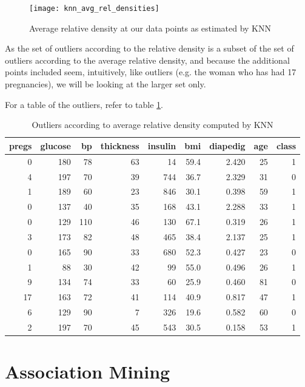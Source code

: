 \begin{figure}[htbp]
  \centering
  \texttt{[image: knn\_avg\_rel\_densities]}
  \caption{Average relative density at our data points as estimated by KNN}
  \label{fig:knn-avg-rel}
\end{figure}

As the set of outliers according to the relative density
is a subset of
the set of outliers according to the average relative density,
and because the additional points included seem, intuitively, like outliers
(e.g. the woman who has had 17 pregnancies),
we will be looking at the larger set only.

For a table of the outliers, refer to table \ref{tab:outliers}.

\begin{table}[hbp]
\begin{tabular}{rrrrrrrrr}
pregs & glucose & bp & thickness & insulin & bmi & dia\textunderscore{}pedig & age & class\\
  \hline
0 & 180 & 78 & 63 & 14 & 59.4 & 2.420 & 25 & 1\\
4 & 197 & 70 & 39 & 744 & 36.7 & 2.329 & 31 & 0\\
1 & 189 & 60 & 23 & 846 & 30.1 & 0.398 & 59 & 1\\
0 & 137 & 40 & 35 & 168 & 43.1 & 2.288 & 33 & 1\\
0 & 129 & 110 & 46 & 130 & 67.1 & 0.319 & 26 & 1\\
3 & 173 & 82 & 48 & 465 & 38.4 & 2.137 & 25 & 1\\
0 & 165 & 90 & 33 & 680 & 52.3 & 0.427 & 23 & 0\\
1 & 88 & 30 & 42 & 99 & 55.0 & 0.496 & 26 & 1\\
9 & 134 & 74 & 33 & 60 & 25.9 & 0.460 & 81 & 0\\
17 & 163 & 72 & 41 & 114 & 40.9 & 0.817 & 47 & 1\\
6 & 129 & 90 & 7 & 326 & 19.6 & 0.582 & 60 & 0\\
2 & 197 & 70 & 45 & 543 & 30.5 & 0.158 & 53 & 1\\
\end{tabular}
\caption{Outliers according to average relative density computed by KNN}
\label{tab:outliers}
\end{table}


\section{Association Mining}


